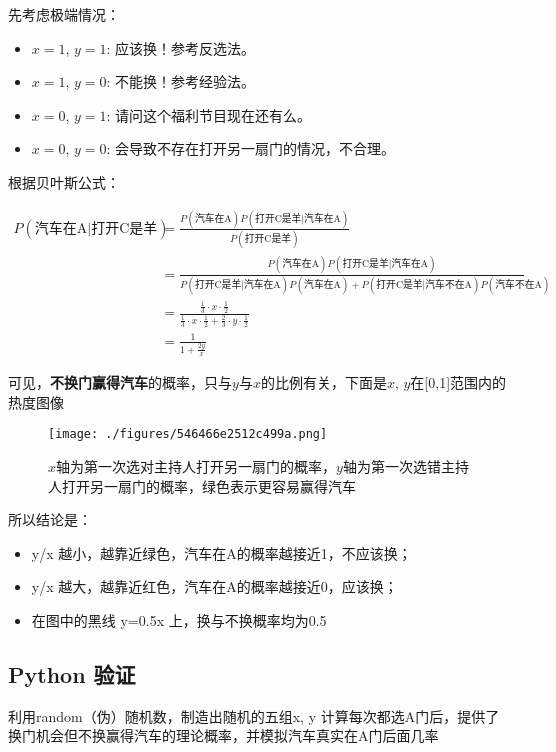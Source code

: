 先考虑极端情况：

\begin{itemize}
\item $x = 1$, $y = 1$: 应该换！参考反选法。
\item $x = 1$, $y = 0$: 不能换！参考经验法。
\item $x = 0$, $y = 1$: 请问这个福利节目现在还有么。
\item $x = 0$, $y = 0$: 会导致不存在打开另一扇门的情况，不合理。
\end{itemize}

根据贝叶斯公式：

\begin{align}
\nonumber
P(\text{汽车在A}|\text{打开C是羊})&=\frac{P(\text{汽车在A})P(\text{打开C是羊}|\text{汽车在A})}{P(\text{打开C是羊})}\\
\nonumber
&=\frac{P(\text{汽车在A})P(\text{打开C是羊}|\text{汽车在A})}{P(\text{打开C是羊}|\text{汽车在A})P(\text{汽车在A})+P(\text{打开C是羊}|\text{汽车不在A})P(\text{汽车不在A})}\\
\nonumber
&=\frac{\frac{1}{3}\cdot x\cdot \frac{1}{2}}{\frac{1}{3}\cdot x\cdot \frac{1}{2}+\frac{2}{3}\cdot y\cdot \frac{1}{2}}\\
\nonumber
&=\frac{1}{1+\frac{2y}{x}}
\end{align}

可见，\textbf{不换门赢得汽车}的概率，只与$y$与$x$的比例有关，下面是$x$, $y$在[0,1]范围内的热度图像

\begin{figure}[ht]
\centering
\texttt{[image: ./figures/546466e2512c499a.png]}
\caption{$x$轴为第一次选对主持人打开另一扇门的概率，$y$轴为第一次选错主持人打开另一扇门的概率，绿色表示更容易赢得汽车} \label {fig_MontyH}
\end{figure}

所以结论是：

\begin{itemize}
\item y/x 越小，越靠近绿色，汽车在A的概率越接近1，不应该换；
\item y/x 越大，越靠近红色，汽车在A的概率越接近0，应该换；
\item 在图中的黑线 y=0.5x 上，换与不换概率均为0.5
\end{itemize}

\subsection{Python 验证}
利用random（伪）随机数，制造出随机的五组x, y 计算每次都选A门后，提供了换门机会但不换赢得汽车的理论概率，并模拟汽车真实在A门后面几率

